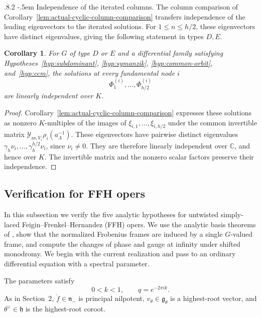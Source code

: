 \documentclass[11pt,leqno]{amsart}
\makeatletter
\numberwithin{equation}{section}
\renewcommand\paragraph{\@startsection{paragraph}{4}{\z@}%
  {.8\baselineskip \@plus .2\baselineskip}%
  {-.5em}%
  {\normalfont\normalsize\bfseries}}
\theoremstyle{plain}
\newtheorem{corollary}[theorem]{Corollary}
\theoremstyle{definition}
\theoremstyle{plain}
\theoremstyle{definition}
\theoremstyle{remark}
\newcommand{\g}{\mathfrak g}
\newcommand{\gh}{\mathfrak h}
\newcommand{\n}{\mathfrak n}
\makeatother
\begin{document}
\paragraph{Independence of the iterated columns.}
The column comparison of Corollary~\ref{lem:actual-cyclic-column-comparison} transfers independence of the leading eigenvectors to the iterated solutions.  For $1\le n\le h/2$, these eigenvectors have distinct eigenvalues, giving the following statement in types $D,E$.

\begin{corollary}\label{cor:finite-block-independence}
For $G$ of type $D$ or $E$ and a differential family satisfying Hypotheses~\ref{hyp:subdominant}, \ref{hyp:symanzik}, \ref{hyp:common-orbit}, and~\ref{hyp:ccm}, the solutions at every fundamental node $i$
\[
 \Phi_1^{(i)},\ldots,\Phi_{h/2}^{(i)}
\]
are linearly independent over $K$.
\end{corollary}
\begin{proof}
Corollary~\ref{lem:actual-cyclic-column-comparison} expresses these solutions as nonzero $K$-multiples of the images of $\xi_{i,1},\ldots,\xi_{i,h/2}$ under the common invertible matrix $\mathcal Y_{\mathrm{as},V_i}\rho_i(a_\Lambda^{-1})$.  These eigenvectors have pairwise distinct eigenvalues $\gamma_h\nu_i,\ldots,\gamma_h^{h/2}\nu_i$, since $\nu_i\ne0$.  They are therefore linearly independent over $\mathbb C$, and hence over $K$.  The invertible matrix and the nonzero scalar factors preserve their independence.
\end{proof}

\subsection{Verification for FFH opers}\label{sec:FFH-frames}\label{sec:FFH-verification}
In this subsection we verify the five analytic hypotheses for untwisted simply-laced Feigin--Frenkel--Hernandez (FFH) opers.  We use the analytic basis theorems of \cite{MR2024}, show that the normalized Frobenius frames are induced by a single $G$-valued frame, and compute the changes of phase and gauge at infinity under shifted monodromy.  We begin with the current realization and pass to an ordinary differential equation with a spectral parameter.

The parameters satisfy
\[
 0<k<1,
 \qquad q=e^{-2\pi ik}.
\]
As in Section~2, $\mathring f\in\n_-$ is principal nilpotent, $v_\theta\in\g_\theta$ is a highest-root vector, and $\theta^\vee\in\gh$ is the highest-root coroot.
\end{document}
